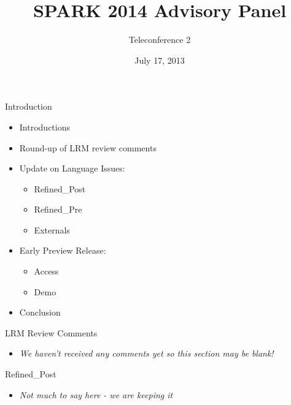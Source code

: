 \documentclass{beamer}
\title{SPARK 2014 Advisory Panel}
\subtitle{Teleconference 2}
\date{July 17, 2013}
\begin{document}
\begin{altrantitle}
\end{altrantitle}

\begin{frame}{Introduction}

  \begin{itemize}

  \item Introductions
  \item Round-up of LRM review comments
  \item Update on Language Issues: 
    \begin{itemize}
    \item Refined\_Post
    \item Refined\_Pre
    \item Externals
    \end{itemize}
  \item Early Preview Release:
    \begin{itemize}
    \item Access
    \item Demo
    \end{itemize}
  \item Conclusion

  \end{itemize}

\end{frame}

\begin{frame}{LRM Review Comments}

  \begin{itemize}

  \item \emph{We haven't received any comments yet so this section may be blank!}

  \end{itemize}

\end{frame}

\begin{frame}{Refined\_Post}

  \begin{itemize}
  \item \emph{Not much to say here - we are keeping it}
  \end{itemize}
 
\end{frame}
\end{document}
